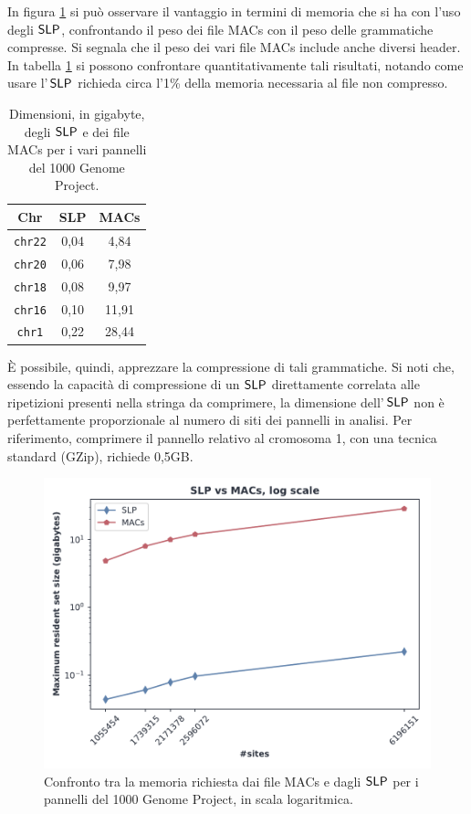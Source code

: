 In figura \ref{fig:slpmacschr} si può osservare il vantaggio in termini di
memoria che si ha con l'uso degli $\mbox{\rm {\sf SLP}}$, confrontando il peso dei file
MACs con il peso delle grammatiche compresse. Si segnala che il
peso dei vari file MACs include anche diversi header. In tabella
\ref{tab:slpmacs} si possono
confrontare quantitativamente tali risultati, notando come usare l'$\,\mbox{\rm {\sf SLP}}$
richieda circa l'1\% della memoria necessaria al file non compresso.
\begin{table}
  \centering
  \caption{Dimensioni, in gigabyte, degli $\mbox{\rm {\sf SLP}}$ e dei file MACs
  per i vari pannelli del 1000 Genome Project.}
  \begin{tabular}{c||c|c}
    \textbf{Chr} & \textbf{SLP}
    & \textbf{MACs} \\
    \hline
    \hline
    \texttt{chr22} & 0,04 & 4,84\\
    \texttt{chr20} & 0,06 & 7,98\\
    \texttt{chr18} & 0,08 & 9,97\\
    \texttt{chr16} & 0,10 & 11,91\\
    \texttt{chr1} & 0,22 & 28,44\\
  \end{tabular}
  \label{tab:slpmacs}
\end{table}
È possibile, quindi, apprezzare la compressione di tali
grammatiche.  
Si noti che, essendo la capacità di compressione di un $\mbox{\rm {\sf SLP}}$
direttamente correlata alle ripetizioni presenti nella stringa da comprimere, la
dimensione dell'$\,\mbox{\rm {\sf SLP}}$ non è perfettamente proporzionale al numero di siti
dei pannelli in analisi. Per riferimento, comprimere il pannello relativo al
cromosoma 1, con una tecnica standard (GZip), richiede 0,5GB.
\begin{figure}
  \centering
  \includegraphics[width=0.7\linewidth]{img/slp_vs_macs_log.pdf}
  \caption{Confronto tra la memoria richiesta dai file MACs e dagli $\mbox{\rm {\sf SLP}}$ per i
    pannelli del 1000 Genome Project, in scala
    logaritmica.} 
  \label{fig:slpmacschr}
\end{figure}
